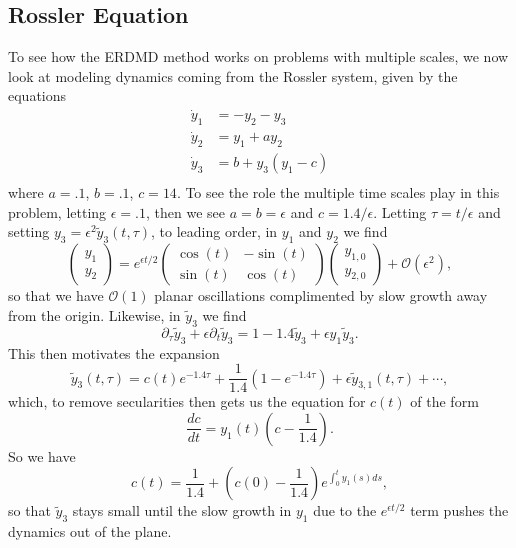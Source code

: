 \documentclass[a4paper,11pt]{article}
\newcommand{\p}{\partial}
\begin{document}
\subsection*{Rossler Equation}

To see how the ERDMD method works on problems with multiple scales, we now look at modeling dynamics coming from the Rossler system, given by the equations
\begin{align*}
\dot{y}_{1} & = -y_{2} - y_{3}\\
\dot{y}_{2} & = y_{1} + ay_{2}\\
\dot{y}_{3} & = b + y_{3}(y_{1}-c)\\
\end{align*} 
where $a=.1$, $b=.1$, $c=14$.  To see the role the multiple time scales play in this problem, letting $\epsilon=.1$, then we see $a=b=\epsilon$ and $c=1.4/\epsilon$.  Letting $\tau = t/\epsilon$ and setting $y_{3} = \epsilon^{2}\tilde{y}_{3}(t,\tau)$, to leading order, in $y_{1}$ and $y_{2}$ we find 
\[
\begin{pmatrix}y_{1} \\ y_{2}\end{pmatrix} = e^{\epsilon t/2}\begin{pmatrix}\cos(t) & -\sin(t) \\ \sin(t) & \cos(t)\end{pmatrix}\begin{pmatrix}y_{1,0} \\ y_{2,0}\end{pmatrix} + \mathcal{O}(\epsilon^{2}),
\]
so that we have $\mathcal{O}(1)$ planar oscillations complimented by slow growth away from the origin.  Likewise, in $\tilde{y}_{3}$ we find 
\[
\p_{\tau}\tilde{y}_{3} + \epsilon \p_{t}\tilde{y}_{3} = 1 - 1.4\tilde{y}_{3} + \epsilon y_{1}\tilde{y}_{3}.
\]
This then motivates the expansion 
\[
\tilde{y}_{3}(t,\tau) = c(t) e^{-1.4\tau} + \frac{1}{1.4}\left(1-e^{-1.4\tau} \right) + \epsilon \tilde{y}_{3,1}(t,\tau) + \cdots, 
\]
which, to remove secularities then gets us the equation for $c(t)$ of the form
\[
\frac{dc}{dt} = y_{1}(t)\left(c - \frac{1}{1.4} \right).
\]
So we have 
\[
c(t) = \frac{1}{1.4} + \left(c(0)-\frac{1}{1.4}\right)e^{\int_{0}^{t}y_{1}(s)ds},
\]
so that $\tilde{y}_{3}$ stays small until the slow growth in $y_{1}$ due to the $e^{\epsilon t/2}$ term pushes the dynamics out of the plane.  
\end{document}
